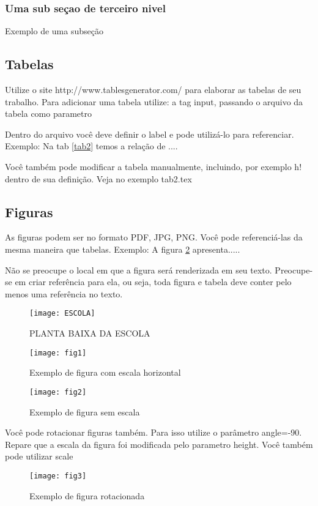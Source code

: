 \documentclass[	DIV=calc,%
							paper=a4,%
							fontsize=12pt,%
							onecolumn]{scrartcl}	 					%
\begin{document}
\subsubsection{Uma sub seçao de terceiro nivel}

Exemplo de uma subseção

\subsection{Tabelas}

Utilize o site http://www.tablesgenerator.com/ para elaborar as tabelas de seu trabalho.
Para adicionar uma tabela utilize: a tag input, passando o arquivo da tabela como parametro



Dentro do arquivo você deve definir o label e pode utilizá-lo para referenciar. Exemplo:
Na tab \ref{tab2} temos a relação de ....


Você também pode modificar a tabela manualmente, incluindo, por exemplo h! dentro de sua definição. Veja no exemplo tab2.tex

\subsection{Figuras}

As figuras podem ser no formato PDF, JPG, PNG. Você pode referenciá-las da mesma maneira que tabelas. Exemplo: A figura \ref{fig1} apresenta.....

Não se preocupe o local em que a figura será renderizada em seu texto. Preocupe-se em criar referência para ela, ou seja, toda figura e tabela deve conter pelo menos uma referência no texto.

\begin{figure}
	\centering
	\texttt{[image: ESCOLA]}
	\caption{PLANTA BAIXA DA ESCOLA}
	\label{ESCOLA}
\end{figure}

\begin{figure}
\centering
\texttt{[image: fig1]}
\caption{Exemplo de figura com escala horizontal}
\label{fig1}
\end{figure}


\begin{figure}
	\centering
	\texttt{[image: fig2]}
	\caption{Exemplo de figura sem escala}
	\label{fig2}
\end{figure}

Você pode rotacionar figuras também. Para isso utilize o parâmetro angle=-90. Repare que a escala da figura foi modificada pelo parametro height. Você também pode utilizar scale

\begin{figure}
	\centering
	\texttt{[image: fig3]}
	\caption{Exemplo de figura rotacionada}
	\label{fig3}
\end{figure}


\end{document}

